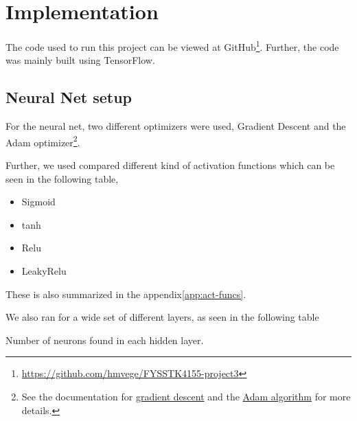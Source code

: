 \section{Implementation}
The code used to run this project can be viewed at GitHub\footnote{\url{https://github.com/hmvege/FYSSTK4155-project3}}. Further, the code was mainly built using TensorFlow\cite{tensorflow2015-whitepaper}.

\subsection{Neural Net setup}
For the neural net, two different optimizers were used, Gradient Descent and the Adam optimizer\footnote{See the documentation for \href{https://www.tensorflow.org/api_docs/python/tf/train/GradientDescentOptimizer}{gradient descent} and the \href{https://www.tensorflow.org/api_docs/python/tf/train/AdamOptimizer}{Adam algorithm}\cite{kingma_adam:_2014} for more details.}. 

Further, we used compared different kind of activation functions which can be seen in the following table,
\begin{itemize}
    \item Sigmoid
    \item tanh
    \item Relu
    \item LeakyRelu
\end{itemize}
These is also summarized in the appendix\ref{app:act-funcs}.

We also ran for a wide set of different layers, as seen in the following table
\begin{table}[h!tb]
    \centering
    \caption{Number of neurons found in each hidden layer.}
    \label{tab:nn-layers}
\end{table}
